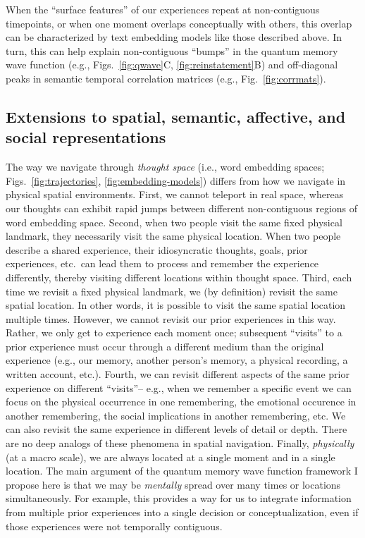 \documentclass{article}
\begin{document}
When the ``surface features'' of our experiences repeat at non-contiguous timepoints, or when one moment overlaps conceptually with others, this overlap can be characterized by text embedding models like those described above.  In turn, this can help explain non-contiguous ``bumps'' in the quantum memory wave function (e.g., Figs.~\ref{fig:qwave}C, \ref{fig:reinstatement}B) and off-diagonal peaks in semantic temporal correlation matrices (e.g., Fig.~\ref{fig:corrmats}).

\subsection*{Extensions to spatial, semantic, affective, and social representations}
The way we navigate through \textit{thought space} (i.e., word embedding spaces; Figs.~\ref{fig:trajectories}, \ref{fig:embedding-models}) differs from how we navigate in physical spatial environments.  First, we cannot teleport in real space, whereas our thoughts can exhibit rapid jumps between different non-contiguous regions of word embedding space.  Second, when two people visit the same fixed physical landmark, they necessarily visit the same physical location.  When two people describe a shared experience, their idiosyncratic thoughts, goals, prior experiences, etc.\ can lead them to process and remember the experience differently, thereby visiting different locations within thought space.  Third, each time we revisit a fixed physical landmark, we (by definition) revisit the same spatial location.  In other words, it is possible to visit the same spatial location multiple times.  However, we cannot revisit our prior experiences in this way.  Rather, we only get to experience each moment once; subsequent ``visits'' to a prior experience must occur through a different medium than the original experience (e.g., our memory, another person’s memory, a physical recording, a written account, etc.).  Fourth, we can revisit different aspects of the same prior experience on different ``visits''-- e.g., when we remember a specific event we can focus on the physical occurrence in one remembering, the emotional occurence in another remembering, the social implications in another remembering, etc.  We can also revisit the same experience in different levels of detail or depth.  There are no deep analogs of these phenomena in spatial navigation.  Finally, \textit{physically} (at a macro scale), we are always located at a single moment and in a single location.  The main argument of the quantum memory wave function framework I propose here is that we may be \textit{mentally} spread over many times or locations simultaneously.  For example, this provides a way for us to integrate information from multiple prior experiences into a single decision or conceptualization, even if those experiences were not temporally contiguous.
\end{document}
